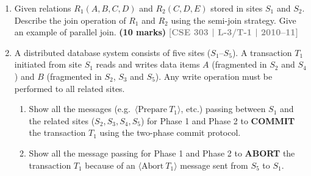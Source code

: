 \documentclass[12pt,a3paper]{article}
\newcommand{\yr}[1]{\hfill\textcolor{gray}{\small\textbf{[#1]}}}
\newcommand{\mk}[1]{\textcolor{orange!70!black}{\small\textbf{(#1 marks)}}}
\begin{document}
\begin{enumerate}

\item Given relations $R_1(A, B, C, D)$ and $R_2(C, D, E)$ stored in sites $S_1$ and $S_2$. Describe the join operation of $R_1$ and $R_2$ using the semi-join strategy. Give an example of parallel join.
\mk{10} \yr{CSE 303 | L-3/T-1 | 2010--11}

\item A distributed database system consists of five sites ($S_1$--$S_5$). A transaction $T_1$ initiated from site $S_1$ reads and writes data items $A$ (fragmented in $S_2$ and $S_4$) and $B$ (fragmented in $S_2$, $S_3$ and $S_5$). Any write operation must be performed to all related sites.
\begin{enumerate}
  \item Show all the messages (e.g.\ $\langle\text{Prepare}\ T_1\rangle$, etc.) passing between $S_1$ and the related sites ($S_2, S_3, S_4, S_5$) for Phase 1 and Phase 2 to \textbf{COMMIT} the transaction $T_1$ using the two-phase commit protocol.
  \item Show all the message passing for Phase 1 and Phase 2 to \textbf{ABORT} the transaction $T_1$ because of an $\langle\text{Abort}\ T_1\rangle$ message sent from $S_5$ to $S_1$.
\end{enumerate}

\begin{center}
\end{center}
\end{enumerate}
\end{document}

